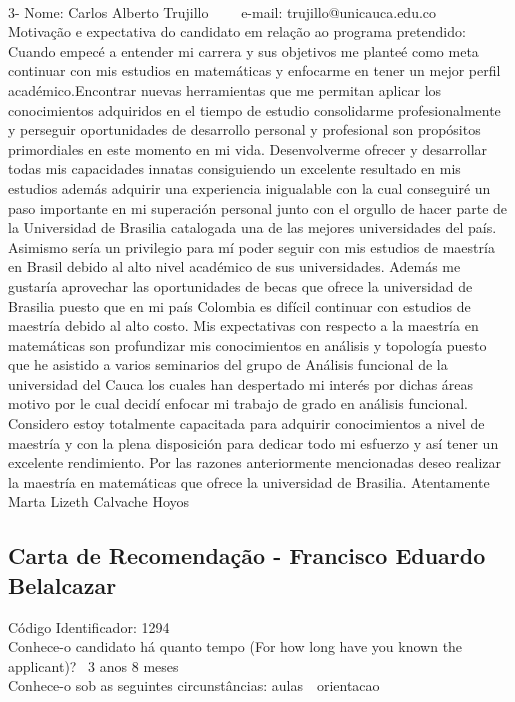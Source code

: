 \documentclass[11pt]{article}
\begin{document}
\\
3- Nome: Carlos Alberto Trujillo
\ \ \ \ e-mail: trujillo@unicauca.edu.co
\\[0.2cm]
Motivação e expectativa do candidato em relação ao programa pretendido:
\\Cuando empecé a entender mi carrera y sus objetivos me planteé como meta continuar con mis estudios en matemáticas y enfocarme en tener un mejor perfil académico.Encontrar nuevas herramientas que me permitan aplicar los conocimientos adquiridos en el tiempo de estudio consolidarme profesionalmente y perseguir oportunidades de desarrollo personal y profesional son propósitos primordiales en este momento en mi vida. Desenvolverme ofrecer y desarrollar todas mis capacidades innatas consiguiendo un excelente resultado en mis estudios además adquirir una experiencia inigualable con la cual conseguiré un paso importante en mi superación personal junto con el orgullo de hacer parte de la Universidad de Brasilia catalogada una de las mejores universidades del país. Asimismo sería un privilegio para mí poder seguir con mis estudios de maestría en Brasil debido al alto nivel académico de sus universidades. Además me gustaría aprovechar las oportunidades de becas que ofrece la universidad de Brasilia puesto que en mi país Colombia es difícil continuar con estudios de maestría debido al alto costo. Mis expectativas con respecto a la maestría en matemáticas son profundizar mis conocimientos en análisis y topología puesto que he asistido a varios seminarios del grupo de Análisis funcional de la universidad del Cauca los cuales han despertado mi interés por dichas áreas motivo por le cual decidí enfocar mi trabajo de grado en análisis funcional. Considero estoy totalmente capacitada para adquirir conocimientos a nivel de maestría y con la plena disposición para dedicar todo mi esfuerzo y así tener un excelente rendimiento. Por las razones anteriormente mencionadas deseo realizar  la maestría en matemáticas que ofrece la universidad de Brasilia. Atentamente
Marta Lizeth Calvache Hoyos \newpage\vspace*{-4cm}\subsection*{Carta de Recomendação - Francisco Eduardo Belalcazar}Código Identificador: 1294\\Conhece-o candidato há quanto tempo (For how long have you known the applicant)? 
\ 3 anos 8 meses
\\ Conhece-o sob as seguintes circunstâncias: aulas\ \ orientacao
\end{document}
